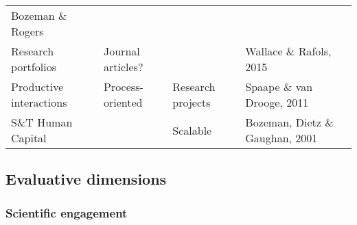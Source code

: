 \documentclass[]{elsarticle} %
\begin{document}
\begin{longtable}[]{@{}llll@{}}
\begin{minipage}[t]{0.16\columnwidth}
Bozeman \& Rogers\strut
\end{minipage}\tabularnewline
\begin{minipage}[t]{0.24\columnwidth}\raggedright
Research portfolios\strut
\end{minipage} & \begin{minipage}[t]{0.23\columnwidth}\raggedright
Journal articles?\strut
\end{minipage} & \begin{minipage}[t]{0.25\columnwidth}\raggedright
\strut
\end{minipage} & \begin{minipage}[t]{0.16\columnwidth}\raggedright
Wallace \& Rafols, 2015\strut
\end{minipage}\tabularnewline
\begin{minipage}[t]{0.24\columnwidth}\raggedright
Productive interactions\strut
\end{minipage} & \begin{minipage}[t]{0.23\columnwidth}\raggedright
Process-oriented\strut
\end{minipage} & \begin{minipage}[t]{0.25\columnwidth}\raggedright
Research projects\strut
\end{minipage} & \begin{minipage}[t]{0.16\columnwidth}\raggedright
Spaape \& van Drooge, 2011\strut
\end{minipage}\tabularnewline
\begin{minipage}[t]{0.24\columnwidth}\raggedright
S\&T Human Capital\strut
\end{minipage} & \begin{minipage}[t]{0.23\columnwidth}\raggedright
\strut
\end{minipage} & \begin{minipage}[t]{0.25\columnwidth}\raggedright
Scalable\strut
\end{minipage} & \begin{minipage}[t]{0.16\columnwidth}\raggedright
Bozeman, Dietz \& Gaughan, 2001\strut
\end{minipage}\tabularnewline
\bottomrule
\end{longtable}

\hypertarget{evaluative-dimensions}{%
\subsection{Evaluative dimensions}\label{evaluative-dimensions}}

\hypertarget{scientific-engagement}{%
\subsubsection{Scientific engagement}\label{scientific-engagement}}
\end{document}
